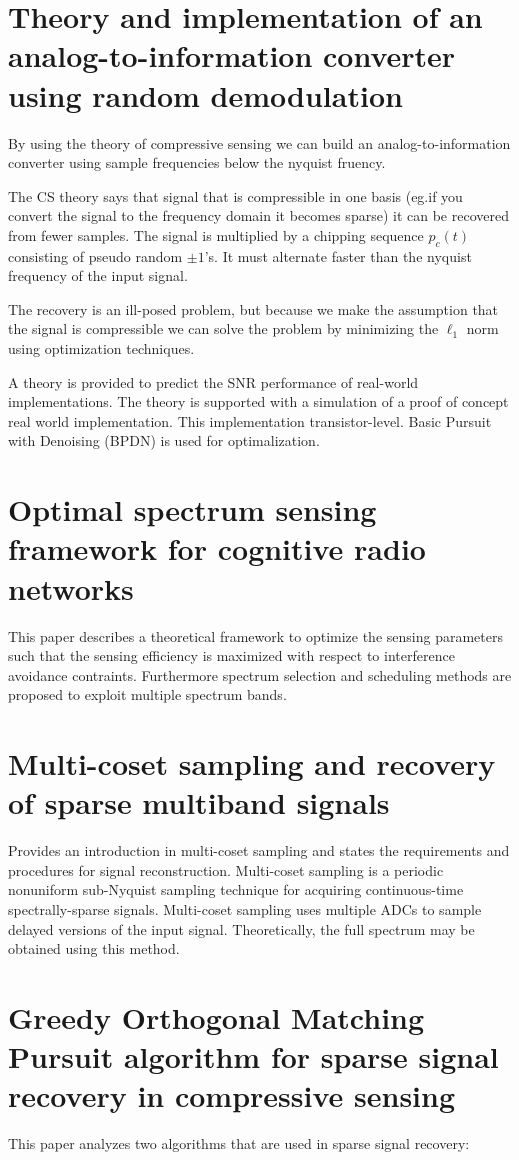 \documentclass[report, oneside, a4paper, openany]{memoir}
\begin{document}
\section{Theory and implementation of an analog-to-information converter using random demodulation \cite{laska2007theory}}
By using the theory of compressive sensing we can build an analog-to-information converter using sample frequencies below the nyquist fruency.

The CS theory says that signal that is compressible in one basis (eg.if you convert the signal to the frequency domain it becomes sparse) it can be recovered from fewer samples. The signal is multiplied by a chipping sequence $p_c(t)$ consisting of pseudo random $\pm1$'s. It must alternate faster than the nyquist frequency of the input signal.

The recovery is an ill-posed problem, but because we make the assumption that the signal is compressible we can solve the problem by minimizing the $\ell_1$ norm using optimization techniques.

A theory is provided to predict the SNR performance of real-world implementations. The theory is supported with a simulation of a proof of concept real world implementation. This implementation transistor-level. Basic Pursuit with Denoising (BPDN) is used for optimalization.
\section{Optimal spectrum sensing framework for cognitive radio networks \cite{lee2008optimal}}
This paper describes a theoretical framework to optimize the sensing parameters
such that the sensing efficiency is maximized with respect to interference
avoidance contraints. Furthermore spectrum selection and scheduling methods are
proposed to exploit multiple spectrum bands.
\section{Multi-coset sampling and recovery of sparse multiband signals \cite{lexa2011multi}}
Provides an introduction in multi-coset sampling and states the requirements and procedures for signal reconstruction. Multi-coset sampling is a periodic nonuniform sub-Nyquist sampling technique for acquiring continuous-time spectrally-sparse signals. Multi-coset sampling uses multiple ADCs to sample delayed versions of the input signal. Theoretically, the full spectrum may be obtained using this method.
\section{Greedy Orthogonal Matching Pursuit algorithm for sparse signal recovery in compressive sensing \cite{li2014gomp}}
This paper analyzes two algorithms that are used in sparse signal recovery:
\end{document}
